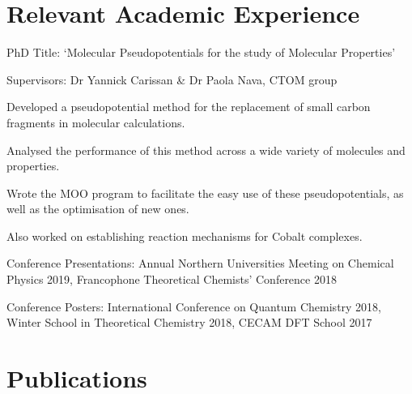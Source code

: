\documentclass[letterpaper]{deedy-resume} %
\begin{document}
\hfill
%
%
\begin{minipage}[t]{0.66\textwidth} %


\section{Relevant Academic Experience}


\vspace{\topsep} %
\begin{tightitemize}
\item PhD Title: `Molecular Pseudopotentials for the study of Molecular Properties'
\item Supervisors: Dr Yannick Carissan \& Dr Paola Nava, CTOM group
\item Developed a pseudopotential method for the replacement of small carbon fragments in molecular calculations.
\item Analysed the performance of this method across a wide variety of molecules and properties.
\item Wrote the MOO program to facilitate the easy use of these pseudopotentials, as well as the optimisation of new ones. 
\item Also worked on establishing reaction mechanisms for Cobalt complexes.
\item Conference Presentations: Annual Northern Universities Meeting on Chemical Physics 2019, Francophone Theoretical Chemists' Conference 2018
\item Conference Posters: International Conference on Quantum Chemistry 2018, Winter School in Theoretical Chemistry 2018, CECAM DFT School 2017
\end{tightitemize}

\sectionspace %

\section{Publications} 


\end{minipage}
\end{document}
